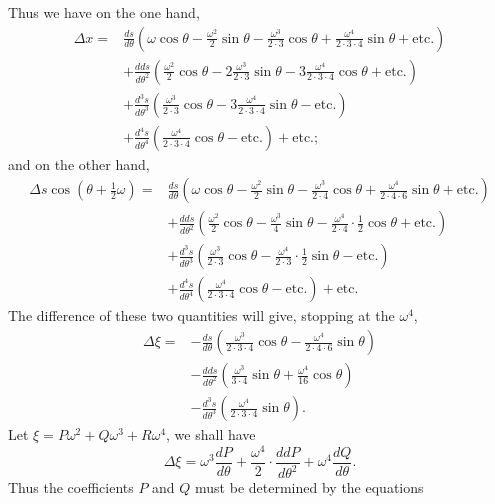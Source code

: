 \documentclass{article}
\begin{document}
Thus we have on the one hand,
\[ \begin{aligned} \Delta x={}&\frac{ds}{d\theta}\left(\omega\cos\theta-\frac{\omega^{2}}{2}\sin\theta-\frac{\omega^{3}}{2\cdot3}\cos\theta+\frac{\omega^{4}}{2\cdot3\cdot4}\sin\theta+\text{etc.}\right)\\ &+\frac{dds}{d\theta^{2}}\left(\frac{\omega^{2}}{2}\cos\theta-2\frac{\omega^{3}}{2\cdot3}\sin\theta-3\frac{\omega^{4}}{2\cdot3\cdot4}\cos\theta+\text{etc.}\right)\\ &+\frac{d^{3}s}{d\theta^{3}}\left(\frac{\omega^{3}}{2\cdot3}\cos\theta-3\frac{\omega^{4}}{2\cdot3\cdot4}\sin\theta-\text{etc.}\right)\\ &+\frac{d^{4}s}{d\theta^{4}}\left(\frac{\omega^{4}}{2\cdot3\cdot4}\cos\theta-\text{etc.}\right)+\text{etc.}; \end{aligned} \]
and on the other hand,
\[ \begin{aligned} \Delta s\cos(\theta+\tfrac{1}{2}\omega)={}&\frac{ds}{d\theta}\left(\omega\cos\theta-\frac{\omega^{2}}{2}\sin\theta-\frac{\omega^{3}}{2\cdot4}\cos\theta+\frac{\omega^{4}}{2\cdot4\cdot6}\sin\theta+\text{etc.}\right)\\ &+\frac{dds}{d\theta^{2}}\left(\frac{\omega^{2}}{2}\cos\theta-\frac{\omega^{3}}{4}\sin\theta-\frac{\omega^{4}}{2\cdot4}\cdot\frac{1}{2}\cos\theta+\text{etc.}\right)\\ &+\frac{d^{3}s}{d\theta^{3}}\left(\frac{\omega^{3}}{2\cdot3}\cos\theta-\frac{\omega^{4}}{2\cdot3}\cdot\frac{1}{2}\sin\theta-\text{etc.}\right)\\ &+\frac{d^{4}s}{d\theta^{4}}\left(\frac{\omega^{4}}{2\cdot3\cdot4}\cos\theta-\text{etc.}\right)+\text{etc.} \end{aligned} \]
The difference of these two quantities will give, stopping at the $\omega^{4}$,
\[ \begin{aligned} \Delta\xi={}&-\frac{ds}{d\theta}\left(\frac{\omega^{3}}{2\cdot3\cdot4}\cos\theta-\frac{\omega^{4}}{2\cdot4\cdot6}\sin\theta\right)\\ &-\frac{dds}{d\theta^{2}}\left(\frac{\omega^{3}}{3\cdot4}\sin\theta+\frac{\omega^{4}}{16}\cos\theta\right)\\ &-\frac{d^{3}s}{d\theta^{3}}\left(\frac{\omega^{4}}{2\cdot3\cdot4}\sin\theta\right). \end{aligned} \]
Let $\xi=P\omega^{2}+Q\omega^{3}+R\omega^{4}$, we shall have
\[ \Delta\xi=\omega^{3}\frac{dP}{d\theta}+\frac{\omega^{4}}{2}\cdot\frac{ddP}{d\theta^{2}}+\omega^{4}\frac{dQ}{d\theta}. \]
Thus the coefficients $P$ and $Q$ must be determined by the equations
\end{document}
